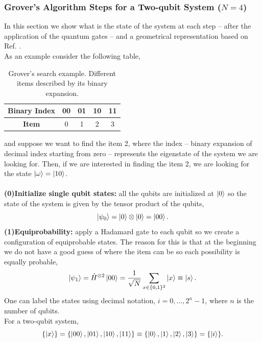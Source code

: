 \subsubsection{Grover's Algorithm Steps for a Two-qubit System ($N=4$)}
In this section we show what is the state of the system at each step -- after the application of the quantum gates -- and a geometrical representation based on Ref. \cite{Lavor2008Search}.\\
As an example consider the following table,
\begin{table}[H]
\centering
\label{tab:GroverSearch}
\begin{tabular}{ | c | c | c | c | c | }
  \hline			
  \textbf{Binary} Index & 00 & 01 & 10 & 11 \\
    \hline		
  \textbf{Item} & 0 & 1 & 2 & 3 \\
  \hline  
\end{tabular}
\caption{Grover's search example. Different items described by its binary expansion.}
\end{table}
and suppose we want to find the item 2, where the index -- binary expansion of decimal index starting from zero -- represents the eigenstate of the system we are looking for. Then, if we are interested in finding the item 2, we are looking for the state $\ket{\omega} = \ket{10}$.\\\\
\textbf{(0)Initialize single qubit states:} all the qubits are initialized at $\ket{0}$ so the state of the system is given by the tensor product of the qubits,
\begin{equation}
    \ket{\psi_{0}} = \ket{0}\otimes \ket{0} = \ket{00}.
\end{equation}
\textbf{(1)Equiprobability:} apply a Hadamard gate to each qubit so we create a configuration of equiprobable states. The reason for this is that at the beginning we do not have a good guess of where the item can be so each possibility is equally probable,
\begin{equation}
    \ket{\psi_{1}} = \hat{H}^{\otimes 2}\ket{00} = \frac{1}{\sqrt{N}}\sum_{x \in \{0,1\}^{2}}\ket{x} \equiv \ket{s}.
\end{equation}
 One can label the states using decimal notation, $i = 0 ,\ldots, 2^{n} -1$, where $n$ is the number of qubits.\\
For a two-qubit system,
\begin{equation}
   \{\ket{x}\} = \{\ket{00},\ket{01},\ket{10},\ket{11}\} \equiv \{\ket{0},\ket{1},\ket{2},\ket{3}\} = \{\ket{i}\}.
\end{equation}
